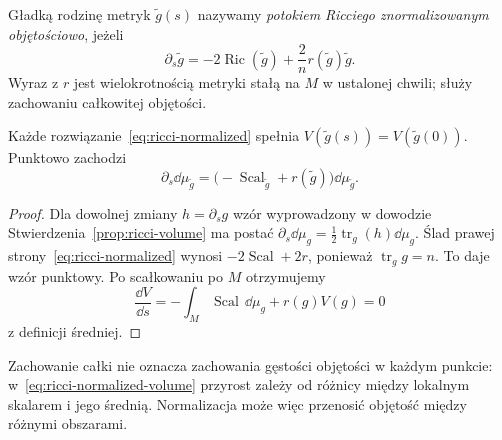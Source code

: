 \begin{definicja}
\label{def:ricci-normalized}
Gładką rodzinę metryk $\widetilde g(s)$ nazywamy
\emph{potokiem Ricciego znormalizowanym objętościowo},
jeżeli
\begin{equation}\label{eq:ricci-normalized}
 \partial_s\widetilde g
 =-2\operatorname{Ric}(\widetilde g)
   +\frac{2}{n}r(\widetilde g)\widetilde g.
\end{equation}
Wyraz z $r$ jest wielokrotnością metryki stałą na $M$
w ustalonej chwili; służy zachowaniu całkowitej objętości.
\end{definicja}

\begin{stwierdzenie}
\label{prop:ricci-normalized-volume}
Każde rozwiązanie~\eqref{eq:ricci-normalized} spełnia
$V(\widetilde g(s))=V(\widetilde g(0))$. Punktowo zachodzi
\begin{equation}\label{eq:ricci-normalized-volume}
 \partial_s\dd\mu_{\widetilde g}
 =\bigl(-\operatorname{Scal}_{\widetilde g}
          +r(\widetilde g)\bigr)\dd\mu_{\widetilde g}.
\end{equation}
\end{stwierdzenie}
\begin{proof}
Dla dowolnej zmiany $h=\partial_sg$ wzór wyprowadzony
w dowodzie Stwierdzenia~\ref{prop:ricci-volume} ma postać
$\partial_s\dd\mu_g=\frac12\operatorname{tr}_g(h)\dd\mu_g$.
Ślad prawej strony~\eqref{eq:ricci-normalized} wynosi
$-2\operatorname{Scal}+2r$, ponieważ
$\operatorname{tr}_g g=n$. To daje wzór punktowy. Po
scałkowaniu po $M$ otrzymujemy
\[
 \frac{\dd V}{\dd s}
 =-\int_M\operatorname{Scal}\,\dd\mu_g+r(g)V(g)=0
\]
z definicji średniej.
\end{proof}

Zachowanie całki nie oznacza zachowania gęstości objętości
w każdym punkcie: w~\eqref{eq:ricci-normalized-volume}
przyrost zależy od różnicy między lokalnym skalarem i jego
średnią. Normalizacja może więc przenosić objętość między
różnymi obszarami.

